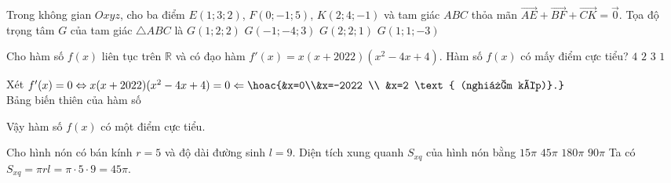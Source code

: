 \begin{ex}%
Trong không gian $Oxyz$, cho ba điểm  $E(1;3;2)$, $F(0;-1;5)$, $K(2;4;-1)$ 
	 và tam giác $ABC$ thỏa mãn $\overrightarrow{AE}+\overrightarrow{BF}+\overrightarrow{CK}=\vec{0}$. Tọa độ trọng tâm $G$ của tam giác $\triangle ABC$ là
	\choice
	{\True $G(1;2;2)$}
	{$G(-1;-4;3)$}
	{$G(2;2;1)$}
	{$G(1;1;-3)$}
\end{ex}

\begin{ex}%
	Cho hàm số $f(x)$ liên tục trên $\mathbb{R}$ và có đạo hàm $f'(x)=x(x+2022)(x^2-4x+4)$. Hàm số $f(x)$ có mấy điểm cực tiểu?
	\choice
	{ $4$}
	{$2$}
	{$3$}
	{\True $1$}
	\loigiai
{ Xét $f'(x)=0 \Leftrightarrow x(x+2022)(x^2-4x+4) =0 \Leftarrow \hoac{&x=0\\&x=-2022 \\ &x=2 \text{ (nghiệm kép)}.}$\\
	Bảng biến thiên của hàm số\\
	\begin{center}
	\end{center}
Vậy hàm số $f(x)$ có một điểm cực tiểu.
	}
\end{ex}

\begin{ex}%
Cho hình nón có bán kính $r=5$ và độ dài đường sinh $l=9$. Diện tích xung quanh $S_{xq}$ của hình nón bằng
	\choice
	{ $15 \pi$}
	{\True $45 \pi$}
	{$180 \pi$}
	{$90 \pi$}
	\loigiai
{ Ta có $S_{xq}=\pi rl=\pi \cdot 5 \cdot 9 =45\pi$.
	}
\end{ex}

